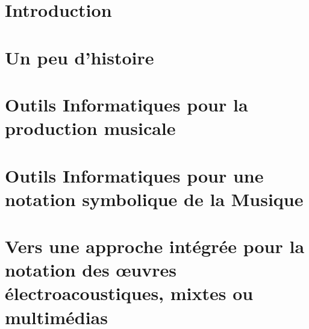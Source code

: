 \documentclass[a4paper, oneside]{book}
\theoremstyle{definition}
\begin{document}



\setcounter{tocdepth}{1} %

\tableofcontents
\clearpage

\thispagestyle{empty}
\section{Introduction}



\section{Un peu d'histoire}
\label{sec:unPeuDHistoire}


\section{Outils Informatiques pour la production musicale}
\label{sec:outilsInfosProdMus}
	

\section{Outils Informatiques pour une notation symbolique de la Musique}
\label{sec:outilsNotationSymbolique}

	
\section[Notation des œuvres électroacoustiques, mixtes ou multimédias]{Vers une approche intégrée pour la notation des œuvres électroacoustiques, mixtes ou multimédias}
\label{sec:outilsNotationElectroMixteMulti}

	
%	
	
\end{document}
